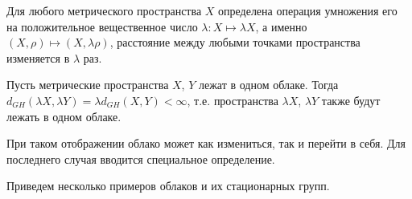  	 Для любого метрического пространства $X$ определена операция умножения его
на положительное вещественное число $\lambda\colon X\mapsto \lambda X$, а именно
$(X, \rho) \mapsto (X, \lambda \rho)$, расстояние между любыми точками
пространства изменяется в $\lambda$ раз.
 	 \begin{remark} Пусть метрические пространства $X$, $Y$ лежат в одном
облаке. Тогда $d_{GH}(\lambda X, \lambda Y) = \lambda d_{GH}(X,Y) < \infty$,
т.е. пространства $\lambda X$, $\lambda Y$ также будут лежать в одном облаке.
 	 \end{remark}  
При таком отображении облако может как измениться, так и перейти в себя. Для последнего случая вводится специальное определение.

Приведем несколько примеров облаков и их стационарных групп.
 	 
